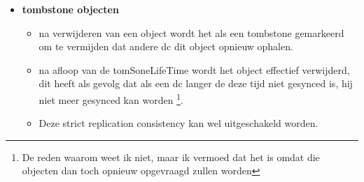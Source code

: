 \begin{itemize}
\item \textbf{tombstone objecten}
\begin{itemize}
\item na verwijderen van een object wordt het als een tombstone gemarkeerd om te vermijden dat andere dc dit object opnieuw ophalen.
\item na afloop van de tomSoneLifeTime wordt het object effectief verwijderd, dit heeft als gevolg dat als een dc langer de deze tijd niet gesynced is, hij niet meer gesynced kan worden \footnote{De reden waarom weet ik niet, maar ik vermoed dat het is omdat die objecten dan toch opnieuw opgevraagd zullen worden}. 
\item Deze strict replication consistency kan wel uitgeschakeld worden.
\end{itemize}
\end{itemize}
\clearpage
